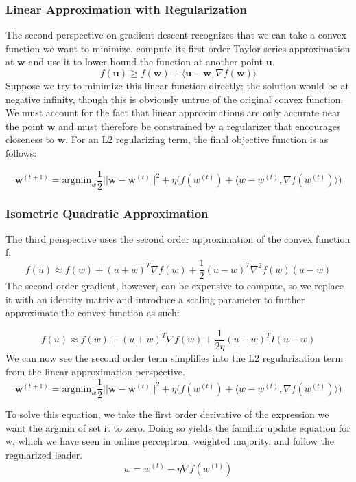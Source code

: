 \documentclass[11pt]{article}
\begin{document}
\subsubsection{Linear Approximation with Regularization}
The second perspective on gradient descent recognizes that we can take a convex function we want to minimize, compute its first order Taylor series approximation at $\textbf{w}$ and use it to lower bound the function at another point $\textbf{u}$.  
$$f(\textbf{u}) \geq f(\textbf{w}) + \langle \textbf{u} - \textbf{w}, \nabla f(\textbf{w}) \rangle$$
Suppose we try to minimize this linear function directly; the solution would be at negative infinity, though this is obviously untrue of the original convex function. We must account for the fact that linear approximations are only accurate near the point $\textbf{w}$ and must therefore be constrained by a regularizer that encourages closeness to $\textbf{w}$. For an L2 regularizing term, the final objective function is as follows:

$$\textbf{w}^{(t+1)} = \text{argmin}_w \frac{1}{2}||\textbf{w} - \textbf{w}^{(t)}||^2 + \eta \Big( f(w^{(t)}) + \langle w - w^{(t)}, \nabla f(w^{(t)})\rangle \Big) $$

\subsubsection{Isometric Quadratic Approximation}
The third perspective uses the second order approximation of the convex function f: 
$$f(u) \approx f(w) + (u+w)^T \nabla f(w) + \frac{1}{2}(u-w)^T \nabla^2f(w)(u-w)$$
The second order gradient, however, can be expensive to compute, so we replace it with an identity matrix and introduce a scaling parameter to further approximate the convex function as such:

$$f(u) \approx f(w) + (u+w)^T \nabla f(w) + \frac{1}{2\eta}(u-w)^T I(u-w)$$
We can now see the second order term simplifies into the L2 regularization term from the linear approximation perspective.
$$\textbf{w}^{(t+1)} = \text{argmin}_w \frac{1}{2}||\textbf{w} - \textbf{w}^{(t)}||^2 + \eta \Big( f(w^{(t)}) + \langle w - w^{(t)}, \nabla f(w^{(t)})\rangle \Big) $$

To solve this equation, we take the first order derivative of the expression we want the argmin of set it to zero. Doing so yields the familiar update equation for w, which we have seen in online perceptron, weighted majority, and follow the regularized leader.
$$w = w^{(t)} - \eta \nabla f(w^{(t)})$$
\end{document}
